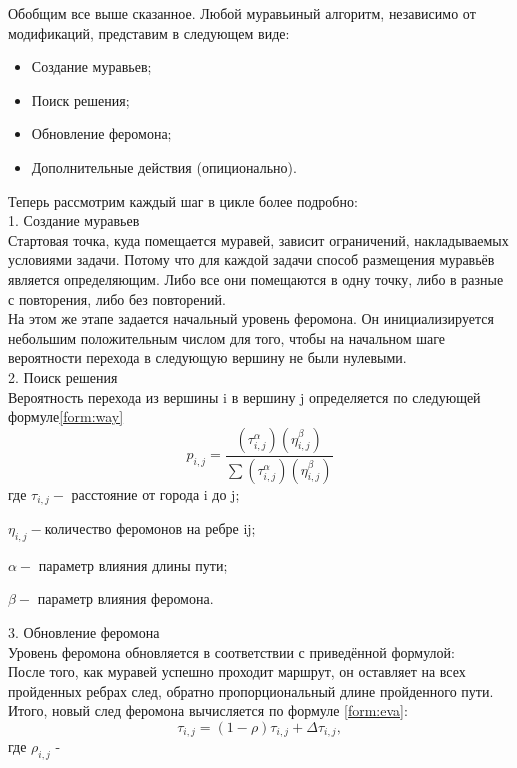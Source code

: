 \documentclass[12pt]{report}
\begin{document}
Обобщим все выше сказанное. Любой муравьиный алгоритм, независимо от модификаций, представим в следующем виде:
\begin{itemize}
	\item Создание муравьев;
	\item Поиск решения;
	\item Обновление феромона;
	\item Дополнительные действия (опиционально).
\end{itemize}

Теперь рассмотрим каждый шаг в цикле более подробно:\\

1. Создание муравьев\\
   Стартовая точка, куда помещается муравей, зависит ограничений,   накладываемых условиями задачи. Потому что для каждой задачи   способ размещения муравьёв является определяющим. Либо все    они помещаются в одну точку, либо в разные с повторения, либо    без повторений. \\
  На этом же этапе задается начальный уровень феромона. Он    инициализируется небольшим положительным числом для того,    чтобы на начальном шаге вероятности перехода в следующую    вершину не были нулевыми. \\
  
2. Поиск решения  \\
 Вероятность перехода из вершины i в вершину j определяется по следующей формуле\ref{form:way}\\   
\begin{equation}\label{form:way} 
 p_{i,j}={\frac {(\tau _{i,j}^{\alpha })(\eta _{i,j}^{\beta })}{\sum (\tau _{i,j}^{\alpha })(\eta _{i,j}^{\beta })}}
 \end{equation}
    где \quad$ \tau _{i,j} - $ расстояние от города i до j;
    
         $\eta _{i,j} - $количество феромонов на ребре ij;
         
          $\alpha - $ параметр влияния длины пути;
          
          $\beta - $ параметр влияния феромона.


3. Обновление феромона \\
  Уровень феромона обновляется в соответствии с приведённой формулой:\\
После того, как муравей успешно проходит маршрут, он оставляет на всех пройденных ребрах след, обратно пропорциональный длине пройденного пути. Итого, новый след феромона вычисляется по формуле \ref{form:eva}:
\begin{equation}\label{form:eva} 
    \tau _{i,j}=(1-\rho )\tau _{i,j}+\Delta \tau _{i,j},
\end{equation}
где \quad$ \rho _{i,j}$ -  
\end{document}
